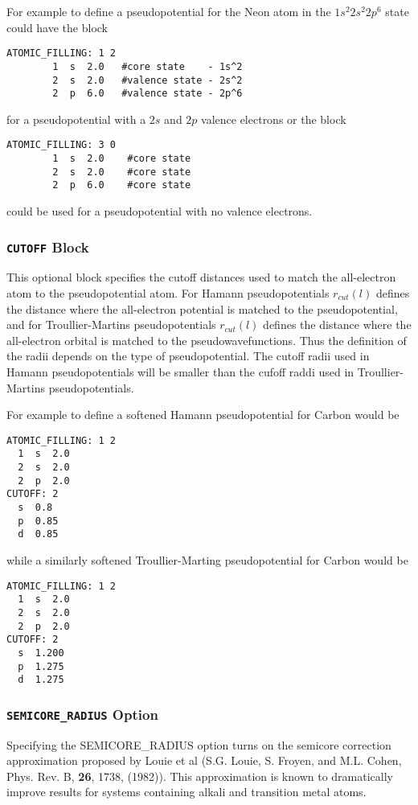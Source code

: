 For example to define a pseudopotential
for the Neon atom in the $1s^2 2s^2 2p^6$ state
could have the block
\begin{verbatim}
ATOMIC_FILLING: 1 2
        1  s  2.0   #core state    - 1s^2 
        2  s  2.0   #valence state - 2s^2
        2  p  6.0   #valence state - 2p^6
\end{verbatim}
for a pseudopotential with a $2s$ and $2p$ valence electrons
or the block
\begin{verbatim}
ATOMIC_FILLING: 3 0
        1  s  2.0    #core state
        2  s  2.0    #core state
        2  p  6.0    #core state
\end{verbatim}
could be used for a pseudopotential with no valence electrons.


\subsubsection{{\tt CUTOFF} Block}
This optional block specifies the cutoff distances used
to match the all-electron atom to the pseudopotential atom.  For
Hamann pseudopotentials $r_{cut}(l)$ defines the distance
where the all-electron potential is matched to the pseudopotential, and
for Troullier-Martins pseudopotentials $r_{cut}(l)$ defines the distance
where the all-electron orbital is matched to the pseudowavefunctions. 
Thus the definition of the radii depends on the type of pseudopotential.  
The cutoff radii used in Hamann pseudopotentials will be smaller than
the cufoff raddi used in Troullier-Martins pseudopotentials.  

For example to define a softened Hamann pseudopotential for
Carbon would be
\begin{verbatim}
ATOMIC_FILLING: 1 2
  1  s  2.0
  2  s  2.0
  2  p  2.0
CUTOFF: 2
  s  0.8
  p  0.85
  d  0.85
\end{verbatim}
while a similarly softened Troullier-Marting pseudopotential
for Carbon would be
\begin{verbatim}
ATOMIC_FILLING: 1 2
  1  s  2.0
  2  s  2.0
  2  p  2.0
CUTOFF: 2
  s  1.200
  p  1.275
  d  1.275
\end{verbatim}


\subsubsection{{\tt SEMICORE\_RADIUS} Option}
Specifying the SEMICORE\_RADIUS option turns on the semicore correction approximation proposed
by Louie et al (S.G. Louie, S. Froyen, and M.L. Cohen, Phys. Rev. B, \textbf{26}, 1738, (1982)).  
This approximation is known to dramatically improve results for systems containing 
alkali and transition metal atoms.  

